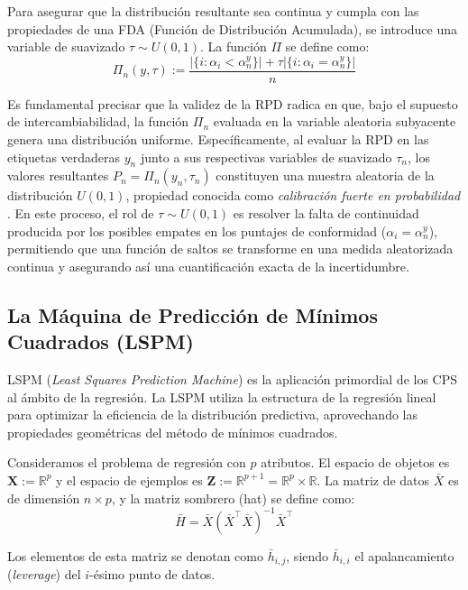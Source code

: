 Para asegurar que la distribución resultante sea continua y cumpla con las propiedades de una FDA (Función de Distribución Acumulada), se introduce una variable de suavizado $\tau \sim U(0,1)$. La función $\Pi$ se define como:
\begin{equation}
\Pi_n(y, \tau) := \frac{|\{i : \alpha_i < \alpha_n^y\}| + \tau |\{i : \alpha_i = \alpha_n^y\}|}{n}
\end{equation}

Es fundamental precisar que la validez de la RPD radica en que, bajo el supuesto de intercambiabilidad, la función $\Pi_n$ evaluada en la variable aleatoria subyacente genera una distribución uniforme. Específicamente, al evaluar la RPD en las etiquetas verdaderas $y_n$ junto a sus respectivas variables de suavizado $\tau_n$, los valores resultantes $P_n = \Pi_n(y_n, \tau_n)$ constituyen una muestra aleatoria de la distribución $U(0,1)$, propiedad conocida como \textit{calibración fuerte en probabilidad} \cite{Vovk2022}. En este proceso, el rol de $\tau \sim U(0,1)$ es resolver la falta de continuidad producida por los posibles empates en los puntajes de conformidad ($\alpha_i = \alpha_n^y$), permitiendo que una función de saltos se transforme en una medida aleatorizada continua y asegurando así una cuantificación exacta de la incertidumbre.


\subsection{La Máquina de Predicción de Mínimos Cuadrados (LSPM)}

LSPM (\textit{Least Squares Prediction Machine})  es la aplicación primordial de los CPS al ámbito de la regresión. La LSPM utiliza la estructura de la regresión lineal para optimizar la eficiencia de la distribución predictiva, aprovechando las propiedades geométricas del método de mínimos cuadrados.

Consideramos el problema de regresión con $p$ atributos. El espacio de objetos es $\mathbf{X} := \mathbb{R}^p$ y el espacio de ejemplos es $\mathbf{Z} := \mathbb{R}^{p+1} = \mathbb{R}^p \times \mathbb{R}$. La matriz de datos $\bar{X}$ es de dimensión $n \times p$, y la matriz sombrero (hat) se define como:
\begin{equation}
    \bar{H} = \bar{X}(\bar{X}^{\top}\bar{X})^{-1}\bar{X}^{\top}
\end{equation}

Los elementos de esta matriz se denotan como $\bar{h}_{i,j}$, siendo $\bar{h}_{i,i}$ el apalancamiento (\textit{leverage}) del $i$-ésimo punto de datos.

